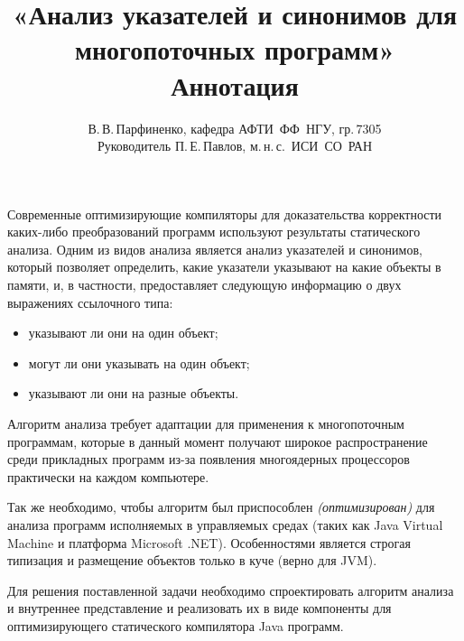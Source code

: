 \documentclass[11pt]{article}
\title{
  «Анализ указателей и синонимов для многопоточных программ»\\
  Аннотация
}
\author{
  В.\,В.\,Парфиненко, кафедра АФТИ~ФФ~НГУ, гр.\,7305\\
  Руководитель П.\,Е.\,Павлов, м.\,н.\,с.~ИСИ~СО~РАН
}
\begin{document}
  \maketitle

  \thispagestyle{empty}

    Современные оптимизирующие компиляторы для доказательства корректности
    каких-либо преобразований программ используют результаты
    статического анализа.
    Одним из видов анализа является анализ указателей и синонимов, который
    позволяет определить, какие указатели указывают на какие объекты в памяти,
    и, в частности, предоставляет следующую информацию о двух выражениях
    ссылочного типа:
    \begin{itemize}
      \item указывают ли они на один объект;
      \item могут ли они указывать на один объект;
      \item указывают ли они на разные объекты.
    \end{itemize}

    Алгоритм анализа требует адаптации для применения к многопоточным
    программам, которые в данный момент получают широкое распространение среди
    прикладных программ из-за появления многоядерных процессоров практически
    на каждом компьютере.

    Так же необходимо, чтобы алгоритм был приспособлен \textit{(оптимизирован)}
    для анализа программ исполняемых в управляемых средах (таких как Java Virtual Machine
    и платформа Microsoft .NET). Особенностями является строгая типизация и
    размещение объектов только в куче (верно для JVM).

    Для решения поставленной задачи необходимо спроектировать алгоритм
    анализа и внутреннее представление и реализовать их в виде компоненты
    для оптимизирующего статического компилятора Java программ.
\end{document}
